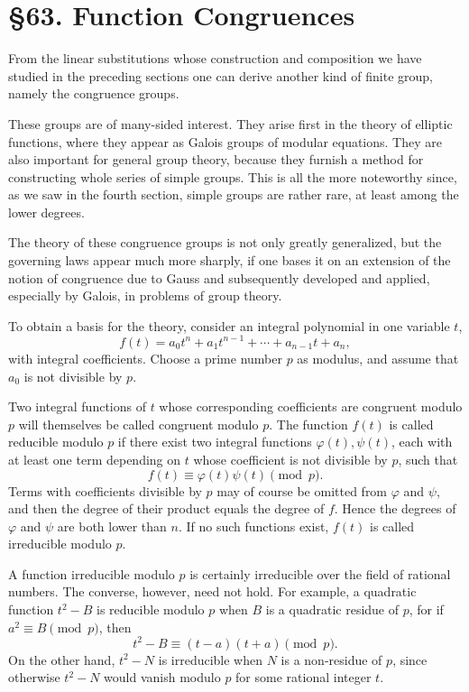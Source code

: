 \documentclass[11pt]{article}
\newcommand{\webersection}[2]{\section*{\S #1. #2}\addcontentsline{toc}{section}{\S #1. #2}}
\begin{document}
\webersection{63}{Function Congruences}

From the linear substitutions whose construction and composition we have studied in the preceding sections one can derive another kind of finite group, namely the congruence groups.

These groups are of many-sided interest.  They arise first in the theory of elliptic functions, where they appear as Galois groups of modular equations.  They are also important for general group theory, because they furnish a method for constructing whole series of simple groups.  This is all the more noteworthy since, as we saw in the fourth section, simple groups are rather rare, at least among the lower degrees.

The theory of these congruence groups is not only greatly generalized, but the governing laws appear much more sharply, if one bases it on an extension of the notion of congruence due to Gauss and subsequently developed and applied, especially by Galois, in problems of group theory.

To obtain a basis for the theory, consider an integral polynomial in one variable \(t\),
\begin{equation}\label{eq:63-1}
 f(t)=a_0t^n+a_1t^{n-1}+\cdots+a_{n-1}t+a_n,
\end{equation}
with integral coefficients.  Choose a prime number \(p\) as modulus, and assume that \(a_0\) is not divisible by \(p\).

Two integral functions of \(t\) whose corresponding coefficients are congruent modulo \(p\) will themselves be called congruent modulo \(p\).  The function \(f(t)\) is called reducible modulo \(p\) if there exist two integral functions \(\varphi(t),\psi(t)\), each with at least one term depending on \(t\) whose coefficient is not divisible by \(p\), such that
\begin{equation}\label{eq:63-2}
 f(t)\equiv \varphi(t)\psi(t)\pmod p.
\end{equation}
Terms with coefficients divisible by \(p\) may of course be omitted from \(\varphi\) and \(\psi\), and then the degree of their product equals the degree of \(f\).  Hence the degrees of \(\varphi\) and \(\psi\) are both lower than \(n\).  If no such functions exist, \(f(t)\) is called irreducible modulo \(p\).

A function irreducible modulo \(p\) is certainly irreducible over the field of rational numbers.  The converse, however, need not hold.  For example, a quadratic function \(t^2-B\) is reducible modulo \(p\) when \(B\) is a quadratic residue of \(p\), for if \(a^2\equiv B\pmod p\), then
\[
 t^2-B\equiv (t-a)(t+a)\pmod p.
\]
On the other hand, \(t^2-N\) is irreducible when \(N\) is a non-residue of \(p\), since otherwise \(t^2-N\) would vanish modulo \(p\) for some rational integer \(t\).
\end{document}
